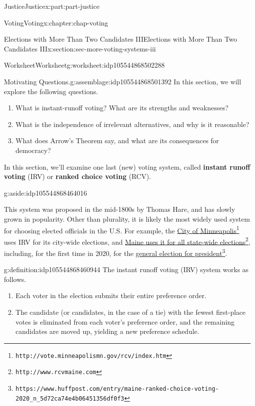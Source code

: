 \documentclass[oneside,10pt,]{book}
\newcommand{\terminology}[1]{\textbf{#1}}
\numberwithin{equation}{section}
\begin{document}
\begin{partptx}{Justice}{}{Justice}{}{}{x:part:part-justice}
\begin{chapterptx}{Voting}{}{Voting}{}{}{x:chapter:chap-voting}
\begin{sectionptx}{Elections with More Than Two Candidates III}{}{Elections with More Than Two Candidates III}{}{}{x:section:sec-more-voting-systems-iii}
%
\begin{worksheet-subsection}{Worksheet}{}{Worksheet}{}{}{g:worksheet:idp105544868502288}
\begin{assemblage}{Motivating Questions.}{g:assemblage:idp105544868501392}%
In this section, we will explore the following questions. %
\begin{enumerate}[label=(\alph*)]
\item{}What is instant-runoff voting? What are its strengths and weaknesses?%
\item{}What is the independence of irrelevant alternatives, and why is it reasonable?%
\item{}What does Arrow's Theorem say, and what are its consequences for democracy?%
\end{enumerate}
%
\end{assemblage}
In this section, we'll examine one last (new) voting system, called \terminology{instant runoff voting} (IRV) or \terminology{ranked choice voting} (RCV). \begin{aside}{}{g:aside:idp105544868464016}%
\end{aside}
 This system was proposed in the mid-1800s by Thomas Hare, and has slowly grown in popularity. Other than plurality, it is likely the most widely used system for choosing elected officials in the U.S. For example, the \href{http://vote.minneapolismn.gov/rcv/index.htm}{City of Minneapolis}\footnote{\nolinkurl{http://vote.minneapolismn.gov/rcv/index.htm}\label{g:fn:idp105544868462864}} uses IRV for its city-wide elections, and \href{http://www.rcvmaine.com}{Maine uses it for all state-wide elections}\footnote{\nolinkurl{http://www.rcvmaine.com}\label{g:fn:idp105544868462096}}, including, for the first time in 2020, for the \href{https://www.huffpost.com/entry/maine-ranked-choice-voting-2020_n_5d72ca74e4b06451356df0f3}{general election for president}\footnote{\nolinkurl{https://www.huffpost.com/entry/maine-ranked-choice-voting-2020_n_5d72ca74e4b06451356df0f3}\label{g:fn:idp105544868461328}}.%
\begin{definition}{}{g:definition:idp105544868460944}%
The instant runoff voting (IRV) system works as follows.%
%
\begin{enumerate}[label=(\alph*)]
\item{}Each voter in the election submits their entire preference order.%
\item{}The candidate (or candidates, in the case of a tie) with the fewest first-place votes is eliminated from each voter's preference order, and the remaining candidates are moved up, yielding a new preference schedule.%

\end{enumerate}
\end{definition}
\end{worksheet-subsection}
\end{sectionptx}
\end{chapterptx}
\end{partptx}
\end{document}
